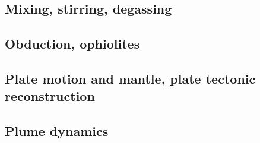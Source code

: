 \subsection*{Mixing, stirring, degassing} 

\cite{olyb84}
\cite{pelt96}
\cite{cori99}
\cite{huke01}
\cite{vahb02}
\cite{fasa03}
\cite{colt05}
\cite{gogc07}\cite{nake07}
\cite{lemj11}\cite{saad11}
\cite{onzh18}

\subsection*{Obduction, ophiolites}
 

\noindent
\cite{hack90}
\cite{hack91}
\cite{agzf14}
\cite{duay16}


\subsection*{Plate motion and mantle, plate tectonic reconstruction}

\noindent
\cite{mcse73}
\cite{zieg92a}
\cite{guto94}
\cite{zhgm98}
\cite{evan03}\cite{reta03}
\cite{lizh09}\cite{vasv09}
\cite{huss12}\cite{gutz12}\cite{qumm12}
\cite{mosq13}
\cite{yoha15}
\cite{tewg19}

\subsection*{Plume dynamics}

